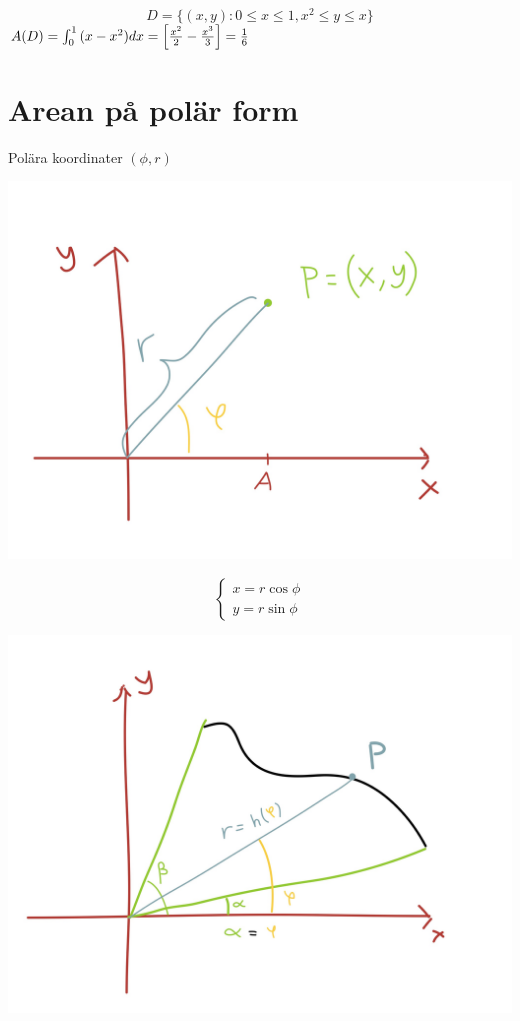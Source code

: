 \documentclass{article}
\begin{document}
$$ D=\{(x,y) : 0\le x \le 1, x^2 \le y\le x \} $$
$A(D) = \int^1_0{ (x-x^2)dx } = \left[ \frac{x^2}{2} - \frac{x^3}{3} \right] = \frac{1}{6}$

\section{Arean på polär form}
Polära koordinater $(\phi, r)$

\includegraphics[scale=0.15]{img/img5.jpg}

$$
\begin{cases}
x=r\cos\phi\\
y=r\sin\phi
\end{cases}
$$

\includegraphics[scale=0.15]{img/img6.jpg}
\end{document}
